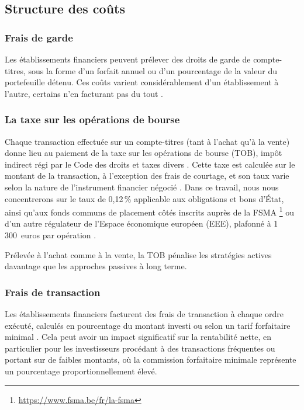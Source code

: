 ﻿\documentclass[12pt, a4paper]{article}
\begin{document}
\subsection{Structure des coûts}

\subsubsection*{Frais de garde}
\label{subsub:frais_garde_cto}

Les établissements financiers peuvent prélever des 
droits de garde de compte-titres, sous la forme d'un forfait
annuel ou d'un pourcentage de la valeur du portefeuille
détenu. Ces coûts varient considérablement
d'un établissement à l'autre, certains n'en facturant pas du tout \cite{guide_epargne}.

\subsubsection*{La taxe sur les opérations de bourse}
\label{subsub:tob_cto}

Chaque transaction effectuée sur un compte-titres (tant à
l'achat qu'à la vente) donne lieu au paiement de la taxe
sur les opérations de bourse (TOB), impôt indirect régi par
le Code des droits et taxes divers
\cite[art.~120]{cdtd1927}. Cette taxe est
calculée sur le montant de la transaction, à l'exception des frais de courtage, et son taux
varie selon la nature de l'instrument financier négocié \cite{spf_tob_faq}.
Dans ce travail, nous nous concentrerons sur le taux de 0,12\,\% applicable aux 
obligations et bons d'État, ainsi
qu'aux fonds communs de placement côtés inscrits
auprès de la FSMA \footnote{\url{https://www.fsma.be/fr/la-fsma}} ou d'un autre 
régulateur de l'Espace économique européen
(EEE), plafonné à 1\,300~euros par opération \cite{wikifin_c}.

Prélevée à l'achat comme à la vente, la TOB pénalise les
stratégies actives davantage que les approches passives à
long terme.

\subsubsection*{Frais de transaction}
\label{subsub:courtage_cto}

Les établissements financiers facturent des
frais de transaction à chaque ordre exécuté, calculés en
pourcentage du montant investi ou selon un tarif
forfaitaire minimal \cite{guide_epargne}. Cela peut avoir un impact
significatif sur la rentabilité nette, en particulier pour
les investisseurs procédant à des transactions fréquentes ou
portant sur de faibles montants, où la commission forfaitaire
minimale représente un pourcentage proportionnellement élevé.
\end{document}
